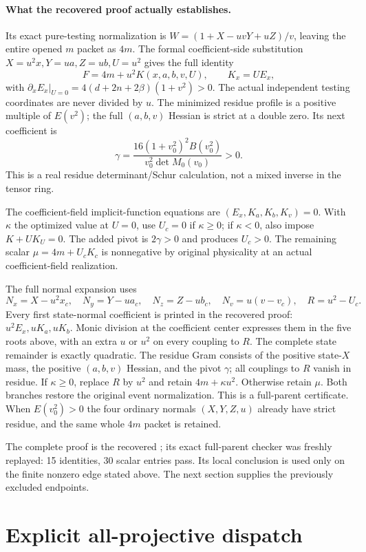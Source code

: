 \paragraph{What the recovered proof actually establishes.}
Its exact pure-testing normalization is
$W=(1+X-uvY+uZ)/v$, leaving the entire opened $m$ packet as $4m$.
The formal coefficient-side substitution
$X=u^2x,Y=ua,Z=ub,U=u^2$ gives the full identity
\[
 F=4m+u^2K(x,a,b,v,U),\qquad K_x=U E_x,
\]
with $\partial_xE_x|_{U=0}=4(d+2n+2\beta)(1+v^2)>0$.
The actual independent testing coordinates are never divided by $u$.
The minimized residue profile is a positive multiple of $E(v^2)$;
the full $(a,b,v)$ Hessian is strict at a double zero. Its next
coefficient is
\[
 \gamma=\frac{16(1+v_0^2)^2 B(v_0^2)}{v_0^2\det M_0(v_0)}>0.
\]
This is a real residue determinant/Schur calculation, not a mixed
inverse in the tensor ring.

The coefficient-field implicit-function equations are
$(E_x,K_a,K_b,K_v)=0$. With $\kappa$ the optimized value at $U=0$,
use $U_c=0$ if $\kappa\geq0$; if $\kappa<0$, also impose
$K+UK_U=0$. The added pivot is $2\gamma>0$ and produces $U_c>0$.
The remaining scalar $\mu=4m+U_cK_c$ is nonnegative by original
physicality at an actual coefficient-field realization.

The full normal expansion uses
\[
 N_x=X-u^2x_c,\quad N_y=Y-ua_c,\quad N_z=Z-ub_c,
 \quad N_v=u(v-v_c),\quad R=u^2-U_c.
\]
Every first state-normal coefficient is printed in the recovered proof:
$u^2E_x,uK_a,uK_b$. Monic division at the coefficient center expresses
them in the five roots above, with an extra $u$ or $u^2$ on every
coupling to $R$. The complete state remainder is exactly quadratic.
The residue Gram consists of the positive state-$X$ mass, the positive
$(a,b,v)$ Hessian, and the pivot $\gamma$; all couplings to $R$ vanish
in residue. If $\kappa\geq0$, replace $R$ by $u^2$ and retain
$4m+\kappa u^2$. Otherwise retain $\mu$. Both branches restore the
original event normalization. This is a full-parent certificate.
When $E(v_0^2)>0$ the four ordinary normals $(X,Y,Z,u)$ already
have strict residue, and the same whole $4m$ packet is retained.

The complete proof is the recovered
; its exact full-parent
checker was freshly replayed: 15 identities, 30 scalar entries pass.
Its local conclusion is used only on the finite nonzero edge stated
above. The next section supplies the previously excluded endpoints.

\section{Explicit all-projective dispatch}

